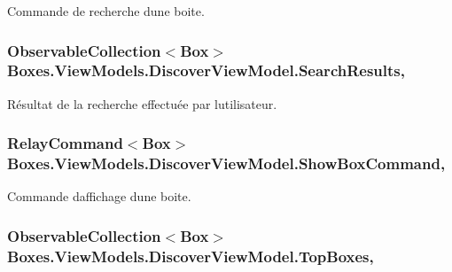 Commande de recherche d\textquotesingle{}une boite. 

\subsubsection[{\texorpdfstring{Search\+Results}{SearchResults}}]{\setlength{\rightskip}{0pt plus 5cm}Observable\+Collection$<${\bf Box}$>$ Boxes.\+View\+Models.\+Discover\+View\+Model.\+Search\+Results\hspace{0.3cm}{\ttfamily [get]}, {\ttfamily [set]}}\hypertarget{class_boxes_1_1_view_models_1_1_discover_view_model_a73bfae617de24675afc97332aca4d78a}{}\label{class_boxes_1_1_view_models_1_1_discover_view_model_a73bfae617de24675afc97332aca4d78a}


Résultat de la recherche effectuée par l\textquotesingle{}utilisateur. 

\subsubsection[{\texorpdfstring{Show\+Box\+Command}{ShowBoxCommand}}]{\setlength{\rightskip}{0pt plus 5cm}Relay\+Command$<${\bf Box}$>$ Boxes.\+View\+Models.\+Discover\+View\+Model.\+Show\+Box\+Command\hspace{0.3cm}{\ttfamily [get]}, {}}\hypertarget{class_boxes_1_1_view_models_1_1_discover_view_model_adc536e0351a3e5ac210564ec78de6e3f}{}\label{class_boxes_1_1_view_models_1_1_discover_view_model_adc536e0351a3e5ac210564ec78de6e3f}


Commande d\textquotesingle{}affichage d\textquotesingle{}une boite. 

\subsubsection[{\texorpdfstring{Top\+Boxes}{TopBoxes}}]{\setlength{\rightskip}{0pt plus 5cm}Observable\+Collection$<${\bf Box}$>$ Boxes.\+View\+Models.\+Discover\+View\+Model.\+Top\+Boxes\hspace{0.3cm}{\ttfamily [get]}, {\ttfamily [set]}}\hypertarget{class_boxes_1_1_view_models_1_1_discover_view_model_a1b4b81f645af78ea5ca8f7de5ced39a3}{}\label{class_boxes_1_1_view_models_1_1_discover_view_model_a1b4b81f645af78ea5ca8f7de5ced39a3}


